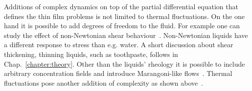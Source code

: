 Additions of complex dynamics on top of the partial differential equation that defines the thin film problems is not limited to thermal fluctuations.
On the one hand it is possible to add degrees of freedom to the fluid. 
For example one can study the effect of non-Newtonian shear behaviour~\cite{zhangNonNewtonianEffectsLubricant2005, myersApplicationNonNewtonianModels2005}. 
Non-Newtonian liquids have a different response to stress than e.g. water. 
A short discussion about shear thickening, thinning liquids, such as toothpaste, follows in Chap.~\ref{chapter:theory}.
Other than the liquids' rheology it is possible to include arbitrary concentration fields and introduce Marangoni-like flows~\cite{sultanEvaporationThinFilm2005, hermansLungSurfactantsDifferent2015, surSteadyProfileFingeringFlows2004}.
Thermal fluctuations pose another addition of complexity as shown above~\cite{grunThinFilmFlowInfluenced2006, meckeThermalFluctuationsThin2005, davidovitchSpreadingViscousFluid2005, zitzLatticeBoltzmannSimulations2021}.

